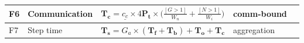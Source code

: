 \begin{table}[!h]
\begin{tabular}{@{}l l l l l@{}}
  \addlinespace[3pt]
  F6 & Communication  & $\boldsymbol{T_c} = \underline{c_c} \times 4 \boldsymbol{P_t} \times \bigl( \tfrac{[G>1]}{W_n} + \tfrac{[N>1]}{W_i} \bigr)$            &
  comm-bound          & \cite{DBLP:journals/ijhpca/ThakurRG05, DBLP:conf/sc/NarayananSCLPKV21, nicolae2025kavier} \\ \midrule
  \addlinespace[3pt]
  F7 & Step time      & $\boldsymbol{T_s} = G_a \times (\boldsymbol{T_f} + \boldsymbol{T_b}) + \boldsymbol{T_o} + \boldsymbol{T_c}$
                  & aggregation         & \cite{DBLP:journals/corr/abs-1909-08053, DBLP:conf/sc/NarayananSCLPKV21} \\
  \bottomrule
  \end{tabular}
  \end{table}

\vspace*{-0,3cm}




